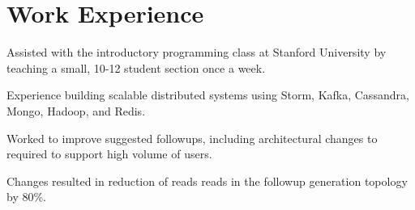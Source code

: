 \documentclass[letterpaper]{deedy-resume} %
\begin{document}
\hfill
%
%
\begin{minipage}[t]{0.66\textwidth} %


\section{Work Experience}


\vspace{\topsep} %
\begin{tightitemize}
\item Assisted with the introductory programming class at Stanford University by teaching a small, 10-12 student section once a week. 
\end{tightitemize}

\sectionspace %



\begin{tightitemize}
\item Experience building scalable distributed systems using Storm, Kafka, Cassandra, Mongo, Hadoop, and Redis.

\item Worked to improve suggested followups, including architectural changes to required to support high volume of users.

\item Changes resulted in reduction of reads reads in the followup generation topology by 80\%.

\end{tightitemize}

\sectionspace %


\end{minipage}
\end{document}
